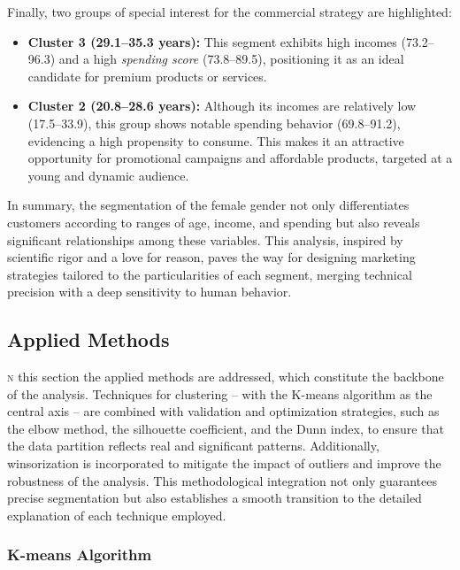 \documentclass[10pt]{article}
\newcommand*\initfamily{\usefont{U}{GoudyIn}{xl}{n}}
\begin{document}
Finally, two groups of special interest for the commercial strategy are highlighted:


\begin{itemize}
    \item \textbf{Cluster 3 (29.1--35.3 years):} This segment exhibits high incomes (73.2--96.3) and a high \textit{spending score} (73.8--89.5), positioning it as an ideal candidate for premium products or services.
    \item \textbf{Cluster 2 (20.8--28.6 years):} Although its incomes are relatively low (17.5--33.9), this group shows notable spending behavior (69.8--91.2), evidencing a high propensity to consume. This makes it an attractive opportunity for promotional campaigns and affordable products, targeted at a young and dynamic audience.
\end{itemize}

In summary, the segmentation of the female gender not only differentiates customers according to ranges of age, income, and spending but also reveals significant relationships among these variables. This analysis, inspired by scientific rigor and a love for reason, paves the way for designing marketing strategies tailored to the particularities of each segment, merging technical precision with a deep sensitivity to human behavior.


\subsection{Applied Methods}

\lettrine[lines=3, loversize=0.01, lhang=0.01]{\scalebox{0.9}{\initfamily I}}{n} this section the applied methods are addressed, which constitute the backbone of the analysis. Techniques for clustering – with the K-means algorithm as the central axis – are combined with validation and optimization strategies, such as the elbow method, the silhouette coefficient, and the Dunn index, to ensure that the data partition reflects real and significant patterns. Additionally, winsorization is incorporated to mitigate the impact of outliers and improve the robustness of the analysis. This methodological integration not only guarantees precise segmentation but also establishes a smooth transition to the detailed explanation of each technique employed.

\subsubsection{K-means Algorithm}
\end{document}
